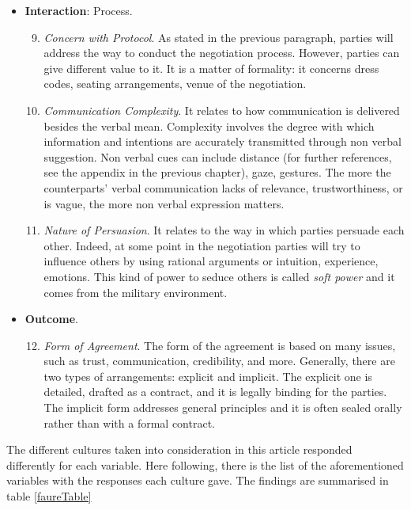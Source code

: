 \documentclass[../main.tex]{subfiles}
\begin{document}
\begin{itemize}
     \item \textbf{Interaction}: Process.
    \begin{enumerate}
        \setcounter{enumi}{8}
        
        \item \textit{Concern with Protocol}. As stated in the previous paragraph, parties will address the way to conduct the negotiation process. However, parties can give different value to it. It is a matter of formality: it concerns dress codes, seating arrangements, venue of the negotiation.
        
        \item \textit{Communication Complexity}. It relates to how communication is delivered besides the verbal mean. Complexity involves the degree with which information and intentions are accurately transmitted through non verbal suggestion. Non verbal cues can include distance (for further references, see the appendix in the previous chapter), gaze, gestures. The more the counterparts' verbal communication lacks of relevance, trustworthiness, or is vague, the more non verbal expression matters.
        
        \item \textit{Nature of Persuasion}. It relates to the way in which parties persuade each other. Indeed, at some point in the negotiation parties will try to influence others by using rational arguments or intuition, experience, emotions. This kind of power to seduce others is called \textit{soft power} and it comes from the military environment.
    \end{enumerate}
    
    \item \textbf{Outcome}.
    \begin{enumerate}
        \setcounter{enumi}{11}
        
        \item \textit{Form of Agreement}. The form of the agreement is based on many issues, such as trust, communication, credibility, and more. Generally, there are two types of arrangements: explicit and implicit. The explicit one is detailed, drafted as a contract, and it is legally binding for the parties. The implicit form addresses general principles and it is often sealed orally rather than with a formal contract.
    \end{enumerate}
\end{itemize}
The different cultures taken into consideration in this article responded differently for each variable. Here following, there is the list of the aforementioned variables with the responses each culture gave. The findings are summarised in table \ref{faureTable}
\end{document}
